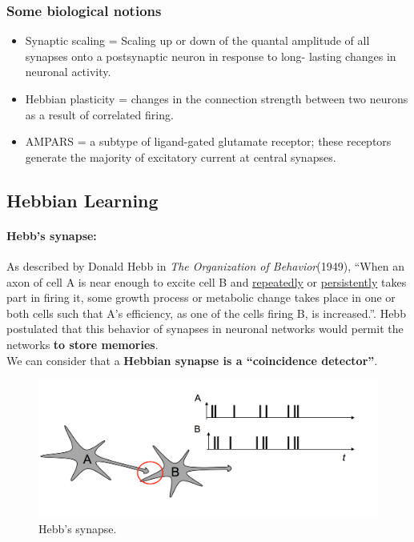 \documentclass[main]{subfiles}
\begin{document}
\subsubsection{Some biological notions}
\begin{itemize}
    \item Synaptic scaling = Scaling up or down of the quantal amplitude of all synapses onto a postsynaptic neuron in response to long- lasting changes in neuronal activity.
    \item Hebbian plasticity = changes in the connection strength between two neurons as a result of correlated firing.
    \item AMPARS = a subtype of ligand-gated glutamate receptor; these receptors generate the majority of excitatory current at central synapses.
\end{itemize}


\newpage
\subsection{Hebbian Learning}

\paragraph{Hebb's synapse:} As described by Donald Hebb in \textit{The Organization of Behavior}(1949), “When an axon of cell A is near enough to excite cell B and \underline{repeatedly} or \underline{persistently} takes part in firing it, some growth process or metabolic change takes place in one or both cells such that A's efficiency, as one of the cells firing B, is increased.”.  Hebb postulated that this behavior of synapses in neuronal networks would permit the networks \textbf{to store memories}.\\

\noindent
We can consider that a \textbf{Hebbian synapse is a “coincidence detector”}.

\begin{figure}[H]
    \centering
    \includegraphics[width=.9\textwidth]{03_PlasticityInTheBrain/figures/Hebb_synapse.png}
    \caption{Hebb's synapse.}
    \label{fig:hebb_synapse}
\end{figure}
\end{document}
